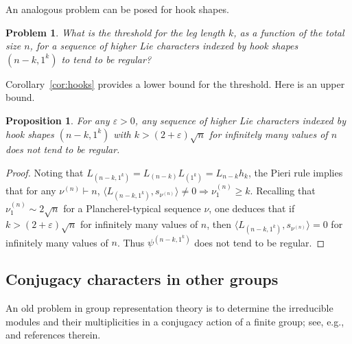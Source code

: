 \documentclass[12pt]%
{amsart}
\theoremstyle{plain}
\newtheorem{proposition}[theorem]{Proposition}
\newtheorem{problem}[theorem]{Problem}
\theoremstyle{definition}
\theoremstyle{remark}
\newcommand{\ve}{\varepsilon}
\newcommand{\todo}[1]{\vspace{5 mm}\par \noindent
	\marginpar{\textsc{ToDo}} \framebox{\begin{minipage}[c]{0.95
				\textwidth}
			#1 \end{minipage}}\vspace{5 mm}\par}
\begin{document}

An analogous problem can be posed for hook shapes.

\begin{problem}
    What is the threshold for the leg length $k$, as a function of the total size $n$, for a sequence of higher Lie characters indexed by hook shapes $(n-k,1^k)$ to tend to be regular?
\end{problem}

Corollary~\ref{cor:hooks} provides a lower bound for the threshold. Here is an upper bound.

\begin{proposition}\label{prop:hooks_t}
    For any $\ve > 0$, any sequence of higher Lie characters indexed by hook shapes $(n-k,1^k)$ with $k> (2 + \ve) \sqrt n$ for infinitely many values of $n$ does not tend to be regular.    
\end{proposition}

\begin{proof}
    Noting that $L_{(n-k,1^k)} = L_{(n-k)} L_{(1^k)} = L_{n-k} h_k$, the Pieri  
    rule implies that for any $\nu^{(n)} \vdash n$, $\langle L_{(n-k,1^k)}, s_{\nu^{(n)}} \rangle \ne 0 \Longrightarrow \nu^{(n)}_1 \ge k$. 
    Recalling that $\nu^{(n)}_1 \sim 2\sqrt n$ for a Plancherel-typical sequence $\nu$, one deduces that 
    if $k> (2 + \ve) \sqrt n$ for infinitely many values of $n$, then
    $\langle L_{(n-k,1^k)}, s_{\nu^{(n)}} \rangle = 0$ for infinitely many values of $n$.
    Thus $\psi^{(n-k,1^k)}$ does not tend to be regular.
\end{proof}






\subsection{Conjugacy characters %
in other groups}

An old problem in group representation theory is to determine the irreducible modules and their multiplicities in a conjugacy action of a finite group; see, e.g., \cite{Heide} and references therein.
\end{document}
